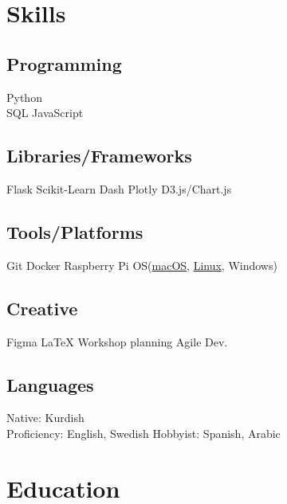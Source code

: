 \documentclass[a4paper]{plushcv}
\begin{document}
\begin{minipage}[t]{0.28\textwidth}
\sectionsep



\section{Skills}
\subsection{Programming}
\sectionsep
{}
Python \\
\sectionsep
{}
SQL \textbullet{} JavaScript \\
\sectionsep
\sectionsep
\subsection{Libraries/Frameworks}
\sectionsep
Flask \textbullet{} Scikit-Learn \textbullet{} Dash Plotly \textbullet{} D3.js/Chart.js \\
\sectionsep
\sectionsep
\subsection{Tools/Platforms}
\sectionsep
Git \textbullet{} Docker \textbullet{} Raspberry Pi \textbullet{} OS(\underline{macOS}, \underline{Linux}, Windows) \\

\sectionsep
\subsection{Creative}
\sectionsep
Figma \textbullet{} \LaTeX \textbullet{} Workshop planning  \textbullet{} Agile Dev. \\
\sectionsep

\subsection{Languages}
\sectionsep
Native: Kurdish \textbullet{} \\ Proficiency: English, Swedish \textbullet{} Hobbyist: Spanish, Arabic \\
\sectionsep


\section{Education} 

\end{minipage}
\end{document}
